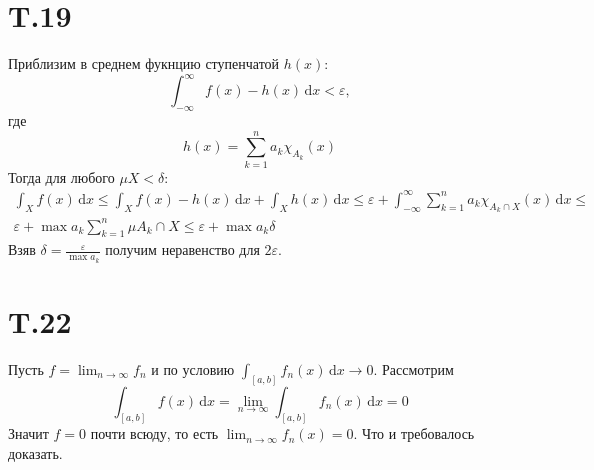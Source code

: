 \documentclass[12pt]{article}
\begin{document}
\section{T.19}
Приблизим в среднем фукнцию ступенчатой $h(x)$: 
\[
    \int_{-\infty}^{\infty} f(x) - h(x) \,\mathrm{d}x < \varepsilon,
\]
где 
\[
    h(x) = \sum_{k=1}^{n} a_k \chi_{A_k}(x)
\] 
Тогда для любого $\mu X < \delta$: 
\[
    \begin{split}
    \int_X f(x) \,\mathrm{d}x \leq \int_X f(x) - h(x) \,\mathrm{d}x + \int_X h(x) \,\mathrm{d}x \leq 
    \varepsilon + \int_{-\infty}^{\infty} \sum_{k=1}^{n} a_k \chi_{A_k \cap X}(x) \,\mathrm{d}x \leq \\ 
    \varepsilon + \max a_k \sum_{k=1}^{n} \mu A_k \cap X \leq  \varepsilon + \max a_k \delta 
    \end{split}
\] 
Взяв $\delta = \frac{\varepsilon}{\max a_k}$ получим неравенство для $2\varepsilon$.  
\section{T.22}
Пусть $f = \lim_{n \to \infty} f_n$ и по условию $\int_{[a, b]} f_n(x) \,\mathrm{d}x \to 0$. Рассмотрим 
\[
    \int_{[a, b]} f(x) \,\mathrm{d}x = \lim_{n \to \infty} \int_{[a, b]} f_n(x) \,\mathrm{d}x = 0  
\]
Значит $f = 0$ почти всюду, то есть $\lim_{n \to \infty} f_n(x) = 0$. Что и требовалось доказать.  
\end{document}
